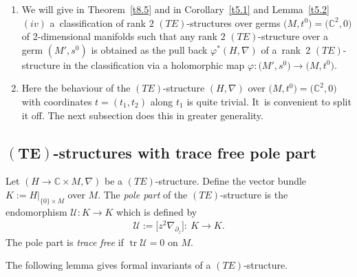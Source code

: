 \documentclass[pdftex]{sigma}%
\numberwithin{equation}{section}
\numberwithin{figure}{section}
\newcommand{\C}{{\mathbb C}}
\newcommand{\UU}{{\mathcal U}}
\newcommand{\paa}{\partial}
\newcommand{\nnn}{\nabla}
\DeclareMathOperator{\tr}{tr}
\begin{document}
\begin{Remarks}\qquad%
\begin{enumerate}\itemsep=0pt
\item[$(i)$] We will give in Theorem~\ref{t8.5}
and in Corollary~\ref{t5.1} and Lemma~\ref{t5.2}$(iv)$
a~classification of rank $2$ $(TE)$-structures
over germs $\big(M,t^0\big)=\big(\C^2,0\big)$ of 2-dimensional manifolds
such that any rank $2$ $(TE)$-structure over a germ
$(M',s^0)$ is obtained as the pull back $\varphi^*(H,\nnn)$
of a~rank~2 $(TE)$-structure in the classification
via a holomorphic map $\varphi\colon \big(M',s^0\big)\to \big(M,t^0\big)$.

\item[$(ii)$] Here the behaviour of the $(TE)$-structure $(H,\nnn)$
over $\big(M,t^0\big)=\big(\C^2,0\big)$ with coordinates $t=(t_1,t_2)$
along $t_1$ is quite trivial. It~is convenient to
split it off. The next subsection does this in greater
generality.
\end{enumerate}
\end{Remarks}

\subsection[$(TE)$-structures with trace free pole part]{$\boldsymbol{(TE)}$-structures with trace free pole part}

\begin{Definition}\label{t3.8}
Let $(H\to\C\times M,\nnn)$ be a $(TE)$-structure.
Define the vector bundle $K:=H|_{\{0\}\times M}$ over $M$.
The {\it pole part} of the $(TE)$-structure is the endomorphism
$\UU\colon K\to K$ which is defined by
\begin{eqnarray}\label{3.16}
\UU:=\big[z^2\nnn_{\paa_z}\big]\colon\ K\to K.
\end{eqnarray}
The pole part is {\it trace free} if $\tr\UU=0$ on $M$.
\end{Definition}

The following lemma gives formal invariants of a $(TE)$-structure.
\end{document}
